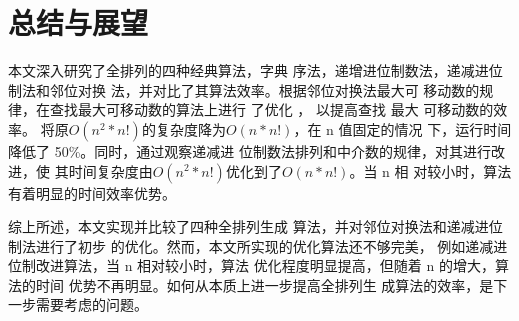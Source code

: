 \documentclass[6pt, twocolumn]{ctexart}
\begin{document}
\section{总结与展望}
本文深入研究了全排列的四种经典算法，字典 序法，递增进位制数法，递减进位制法和邻位对换 法，并对比了其算法效率。根据邻位对换法最大可 移动数的规律，在查找最大可移动数的算法上进行 了优化 ， 以提高查找 最大 可移动数的效率。 将原$O(n^2*n!)$的复杂度降为$O(n* n!)$，在 n 值固定的情况 下，运行时间降低了 50\%。同时，通过观察递减进 位制数法排列和中介数的规律，对其进行改进，使 其时间复杂度由$O(n^2*n!)$优化到了$O(n * n!)$。当 n 相 对较小时，算法有着明显的时间效率优势。



综上所述，本文实现并比较了四种全排列生成 算法，并对邻位对换法和递减进位制法进行了初步 的优化。然而，本文所实现的优化算法还不够完美， 例如递减进位制改进算法，当 n 相对较小时，算法 优化程度明显提高，但随着 n 的增大，算法的时间 优势不再明显。如何从本质上进一步提高全排列生 成算法的效率，是下一步需要考虑的问题。
\printbibliography
\end{document}

